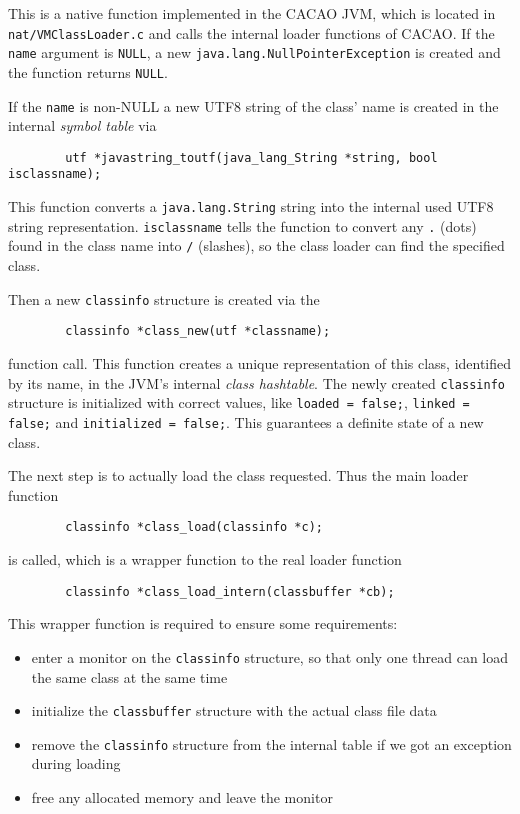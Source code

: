 This is a native function implemented in the CACAO JVM, which is
located in \texttt{nat/VMClassLoader.c} and calls the internal loader
functions of CACAO. If the \texttt{name} argument is \texttt{NULL}, a
new \texttt{java.lang.NullPointerException} is created and the
function returns \texttt{NULL}.

If the \texttt{name} is non-NULL a new UTF8 string of the class' name
is created in the internal \textit{symbol table} via

\begin{verbatim}
        utf *javastring_toutf(java_lang_String *string, bool isclassname);
\end{verbatim}

This function converts a \texttt{java.lang.String} string into the
internal used UTF8 string representation. \texttt{isclassname} tells
the function to convert any \texttt{.} (dots) found in the class name
into \texttt{/} (slashes), so the class loader can find the specified
class.

Then a new \texttt{classinfo} structure is created via the

\begin{verbatim}
        classinfo *class_new(utf *classname);
\end{verbatim}

function call. This function creates a unique representation of this
class, identified by its name, in the JVM's internal \textit{class
hashtable}. The newly created \texttt{classinfo} structure is
initialized with correct values, like \texttt{loaded = false;},
\texttt{linked = false;} and \texttt{initialized = false;}. This
guarantees a definite state of a new class.

The next step is to actually load the class requested. Thus the main
loader function

\begin{verbatim}
        classinfo *class_load(classinfo *c);
\end{verbatim}

is called, which is a wrapper function to the real loader function

\begin{verbatim}
        classinfo *class_load_intern(classbuffer *cb);
\end{verbatim}

This wrapper function is required to ensure some requirements:

\begin{itemize}
 \item enter a monitor on the \texttt{classinfo} structure, so that
 only one thread can load the same class at the same time

 \item initialize the \texttt{classbuffer} structure with the actual
 class file data

 \item remove the \texttt{classinfo} structure from the internal table
 if we got an exception during loading

 \item free any allocated memory and leave the monitor
\end{itemize}

